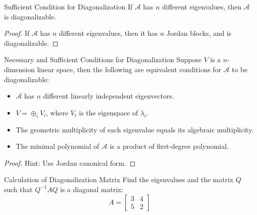 \begin{proposition}{Sufficient Condition for Diagonalization}{}
  If $\mathcal{A}$ has $n$ different eigenvalues,
  then $\mathcal{A}$ is diagonalizable.
\end{proposition}

\begin{proof}
  If $\mathcal{A}$ has $n$ different eigenvalues, then it has $n$ Jordan blocks,
  and is diagonalizable.
\end{proof}

\begin{proposition}{Necessary and Sufficient Conditions for Diagonalization}{}
  Suppose $V$ is a $n$-dimension linear space,
  then the following are equivalent conditions for $\mathcal{A}$ to be diagonalizable:
  \begin{itemize}
  \item $\mathcal{A}$ has $n$ different linearly independent eigenvectors.
  \item $V = \oplus_i V_i$, where $V_i$ is the eigenspace of $\lambda_i$.
  \item The geometric multiplicity of each eigenvalue equals its algebraic multiplicity.
  \item The minimal polynomial of $\mathcal{A}$ is a product of first-degree polynomial.
  \end{itemize}
\end{proposition}

\begin{proof}
  Hint: Use Jordan canonical form.
\end{proof}

\begin{example}{Calculation of Diagonalization Matrix}{}
  Find the eigenvalues and the matrix $Q$ such that $Q^{-1}AQ$
  is a diagonal matrix:
  \begin{equation}
    A =
    \begin{bmatrix}
      3 & 4\\
      5 & 2
    \end{bmatrix}
  \end{equation}
\end{example}

